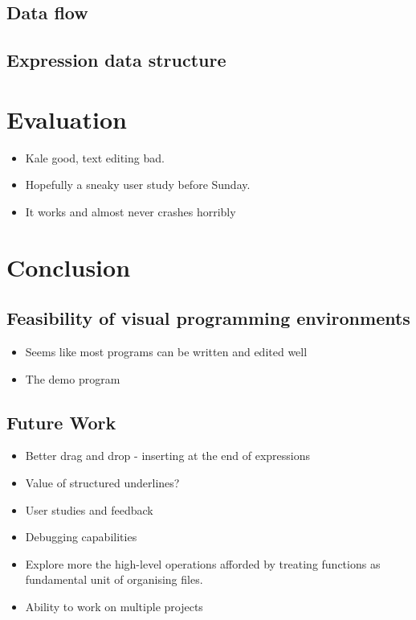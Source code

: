 \documentclass[11pt]{report}
\begin{document}
\section{Data flow}
\section{Expression data structure}

\chapter{Evaluation}

\begin{itemize}[noitemsep]
	\item Kale good, text editing bad.
	\item Hopefully a sneaky user study before Sunday.
	\item It works and almost never crashes horribly
\end{itemize}

\chapter{Conclusion}
\section{Feasibility of visual programming environments}
\begin{itemize}[noitemsep]
	\item Seems like most programs can be written and edited well
	\item The demo program
\end{itemize}

\section{Future Work}

\begin{itemize}[noitemsep]
	\item Better drag and drop - inserting at the end of expressions
	\item Value of structured underlines?
	\item User studies and feedback
	\item Debugging capabilities
	\item Explore more the high-level operations afforded by treating functions as
	fundamental unit of organising files.
	\item Ability to work on multiple projects
\end{itemize}

\endgroup
\clearpage

\renewcommand*{\bibfont}{\raggedright}



\begin{appendices}
	
\end{appendices}
\end{document}
